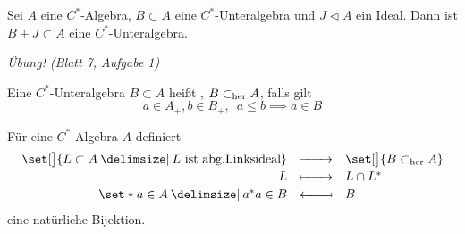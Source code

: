 \begin{proposition}[{name=[Summe von C*-Unteralgebra mit Ideal]}]
	Sei $A$ eine $C^*$-Algebra, $B \subset A$ eine $C^*$-Unteralgebra und $J \lhd A$ ein Ideal. Dann ist $B+J \subset A$ eine $C^*$-Unteralgebra.
\end{proposition}
\begin{beweis}
	\emph{Übung! (Blatt 7, Aufgabe 1)}
\end{beweis}

\begin{definition}[{name=[hereditäre C*-Unteralgebra]}]
	Eine $C^*$-Unteralgebra $B \subset A$ heißt , $B \subset_{\operatorname{her}} A$, falls gilt
	\[
		a \in A_+, b \in B_+, \enspace a \le b \implies a \in B
	\]
\end{definition}

\begin{satz}[label=satz:49,{name=[Bijektion abgeschlossene Linksideale und hereditäre C*-Algebren]}]
	Für eine $C^*$-Algebra $A$ definiert
	\[
		\begin{array}{rcl}
			\set[\big]{L \subset A \given L \text{ ist abg.Linksideal} } &\xrightarrow{\minwidthbox{ }{2em}} & \set[\big]{B \subher A} \\[0.5ex]
			\textstyle L &\xmapsto{\minwidthbox{\mbox{ }}{2em}} & \textstyle L \cap L^* \\[0.5ex]
			\textstyle \set*{a \in A \given a^*a \in B} &\reflectbox{\ensuremath{\xmapsto{\minwidthbox{\mbox{ }}{2em}}}} & \textstyle B 
		\end{array}
	\]
	eine natürliche Bijektion.
\end{satz}
